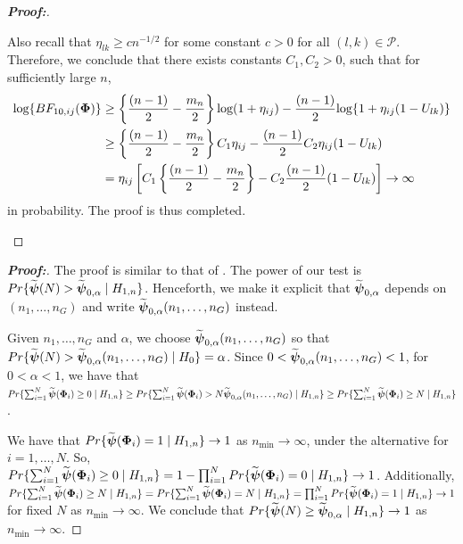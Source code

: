 \documentclass[APA,Times1COL]{WileyNJDv5} %
\def\log{\hbox{log}}
\def\log{\hbox{log}}
\def\boldpsi{{\mbox{\boldmath $\psi$}}}
\newcommand{\uPhi}              {\mbox{\boldmath$\Phi$}}
\begin{document}
\begin{proof}[\textbf{\upshape Proof:}]
\begin{description}
{Also recall that $\eta_{lk} \geq cn^{-1/2}$ for some constant $c > 0$ for all $(l,k)\in\mathcal{P}$. Therefore, we conclude that there exists constants $C_1, C_2 > 0$, such that for sufficiently large $n$,
\begin{align*}
    \log\{BF_{10, ij}(\uPhi) \} & \geq \left\{\frac{(n - 1)}{2} - \frac{m_n}{2}\right\}\log(1 + \eta_{ij}) - \frac{(n - 1)}{2}\log\{1 + \eta_{ij}(1 - U_{lk})\}\\
    &\geq \left\{\frac{(n - 1)}{2} - \frac{m_n}{2}\right\}C_1\eta_{ij} - \frac{(n - 1)}{2}C_2\eta_{ij}(1 - U_{lk})\\
    & = \eta_{ij}\left[C_1\left\{\frac{(n - 1)}{2} - \frac{m_n}{2}\right\} - C_2\frac{(n - 1)}{2}(1 - U_{lk})\right]\to \infty
\end{align*}
in probability. The proof is thus completed. 
}

\end{description}
\end{proof}



\begin{proof}[\textbf{\upshape Proof:}]
The proof is similar to that of \cite{zoh2018powerful}. %
The power of our test is $Pr\{ \widetilde{\boldpsi}(N) > \widetilde{\boldpsi}_{0,\alpha}\mid  H_{1,n}\}$.
Henceforth, we make it explicit that $\widetilde{\boldpsi}_{0,\alpha}$ depends on $(n_1, \ldots ,n_G)$ and write $\widetilde{\boldpsi}_{0,\alpha}(n_1, \ldots, n_G)$ instead.

Given $n_1, \ldots, n_G$ and $\alpha$, we choose $\widetilde{\boldpsi}_{0,\alpha}(n_1, \ldots, n_G)$ so that $Pr\{\widetilde{\boldpsi}(N) > \widetilde{\boldpsi}_{0, \alpha}(n_1, \ldots,n_G)\mid  H_{0}\}  = \alpha$.
Since $ 0 < \widetilde{\boldpsi}_{0,\alpha}(n_1, \ldots,n_G) < 1$, for $0 < \alpha < 1$, we have that $Pr\{ \sum^{N}_{i=1}\widetilde{\boldpsi}(\uPhi_i) \geq 0 \mid H_{1,n} \} \geq Pr\{ \sum^{N}_{i=1}\widetilde{\boldpsi}(\uPhi_i) > N\widetilde{\boldpsi}_{0,\alpha}(n_1, \ldots ,n_G) \mid H_{1,n} \} \geq Pr\{ \sum^{N}_{i=1}\widetilde{\boldpsi}(\uPhi_i) \geq N \mid H_{1,n} \}$.

We have that $Pr\{\widetilde{\boldpsi}(\uPhi_i) =1 \mid H_{1,n}\} \rightarrow 1$ as $n_{\min} \rightarrow \infty$, under the alternative for $i = 1, \ldots, N$. So, $Pr\{ \sum^{N}_{i=1}\widetilde{\boldpsi}(\uPhi_i) \geq 0 \mid H_{1,n} \} = 1 - \prod_{i=1}^{N}Pr\{\widetilde{\boldpsi}(\uPhi_i) = 0 \mid H_{1,n} \} \rightarrow 1$.
Additionally, $Pr\{ \sum^{N}_{i=1}\widetilde{\boldpsi}(\uPhi_i) \geq N \mid H_{1,n} \} = Pr\{ \sum^{N}_{i=1}\widetilde{\boldpsi}(\uPhi_i) = N \mid H_{1,n} \} = \prod_{i=1}^{N}Pr\{\widetilde{\boldpsi}(\uPhi_i) = 1 \mid H_{1,n}\} \rightarrow 1$ for fixed $N$ as $n_{\min} \rightarrow \infty$. We conclude that $Pr\{ \widetilde{\boldpsi}(N) \geq \widetilde{\boldpsi}_{0, \alpha}\mid  H_{1,n}\} \rightarrow 1$ as $n_{\min} \rightarrow \infty.$
\end{proof}
\end{document}
